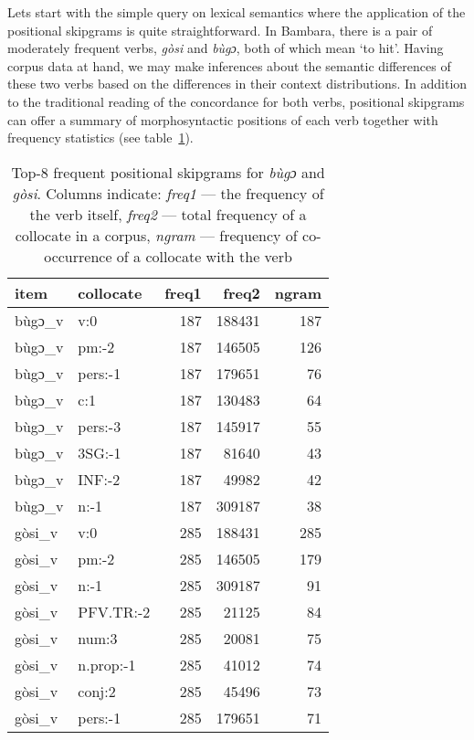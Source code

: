 \documentclass[12pt]{article}
\begin{document}
Lets start with the simple query on lexical semantics where the
application of the positional skipgrams is quite straightforward.  In
Bambara, there is a pair of moderately frequent verbs, \textit{gòsi}
and \textit{bùgɔ}, both of which mean ‘to hit’. Having corpus data at
hand, we may make inferences about the semantic differences of these
two verbs based on the differences in their context distributions.  In
addition to the traditional reading of the concordance for both verbs,
positional skipgrams can offer a summary of morphosyntactic positions of
each verb together with frequency statistics (see table~\ref{tab:bugogosi.freq}). 

\begin{table}
  \small
  \centering
  \begin{tabular}{llrrr}
    \toprule
    item & collocate & freq1 & freq2 & ngram\\
    \midrule
    bùgɔ\_v & v:0 & 187 & 188431 & 187\\
    bùgɔ\_v & pm:-2 & 187 & 146505 & 126\\
    bùgɔ\_v & pers:-1 & 187 & 179651 & 76\\
    bùgɔ\_v & c:1 & 187 & 130483 & 64\\
    bùgɔ\_v & pers:-3 & 187 & 145917 & 55\\
    bùgɔ\_v & 3SG:-1 & 187 & 81640 & 43\\
    bùgɔ\_v & INF:-2 & 187 & 49982 & 42\\
    bùgɔ\_v & n:-1 & 187 & 309187 & 38\\
    \addlinespace
    gòsi\_v & v:0 & 285 & 188431 & 285\\
    gòsi\_v & pm:-2 & 285 & 146505 & 179\\
    gòsi\_v & n:-1 & 285 & 309187 & 91\\
    gòsi\_v & PFV.TR:-2 & 285 & 21125 & 84\\
    gòsi\_v & num:3 & 285 & 20081 & 75\\
    gòsi\_v & n.prop:-1 & 285 & 41012 & 74\\
    gòsi\_v & conj:2 & 285 & 45496 & 73\\
    gòsi\_v & pers:-1 & 285 & 179651 & 71\\
    \bottomrule
  \end{tabular}
  
  \caption{Top-8 frequent positional skipgrams for \textit{bùgɔ} and
    \textit{gòsi}. Columns indicate: \textit{freq1} — the frequency of
    the verb itself, \textit{freq2} — total frequency of a collocate
    in a corpus, \textit{ngram} — frequency of co-occurrence of a
    collocate with the verb}
  \label{tab:bugogosi.freq}
\end{table}
\end{document}
